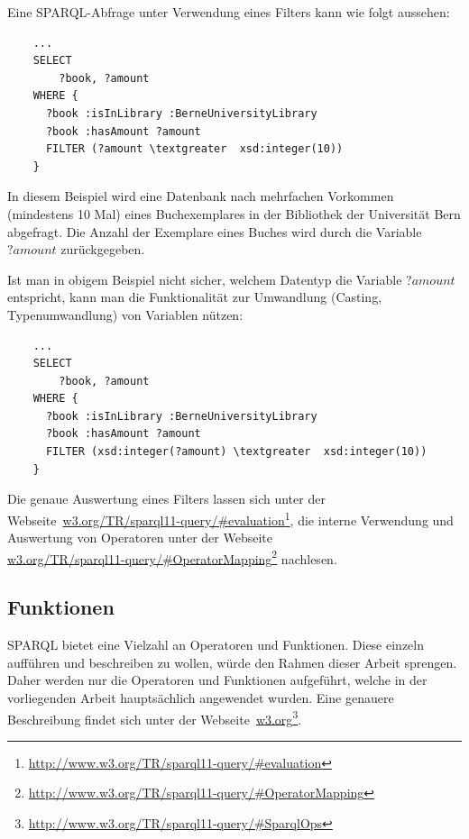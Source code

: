 Eine SPARQL-Abfrage unter Verwendung eines Filters kann wie folgt aussehen:
\begin{lstlisting}
    ...
    SELECT
        ?book, ?amount
    WHERE {
      ?book :isInLibrary :BerneUniversityLibrary
      ?book :hasAmount ?amount
      FILTER (?amount \textgreater  xsd:integer(10))
    }
\end{lstlisting}
In diesem Beispiel wird eine Datenbank nach mehrfachen Vorkommen (mindestens 10 Mal) eines Buchexemplares in der Bibliothek der Universität Bern abgefragt. Die Anzahl der Exemplare eines Buches wird durch die Variable $?amount$ zurückgegeben.

Ist man in obigem Beispiel nicht sicher, welchem Datentyp die Variable $?amount$ entspricht, kann man die Funktionalität zur Umwandlung (Casting, Typenumwandlung) von Variablen nützen:
\begin{lstlisting}
    ...
    SELECT
        ?book, ?amount
    WHERE {
      ?book :isInLibrary :BerneUniversityLibrary
      ?book :hasAmount ?amount
      FILTER (xsd:integer(?amount) \textgreater  xsd:integer(10))
    }
\end{lstlisting}

Die genaue Auswertung eines Filters lassen sich unter der Webseite~\href{http://www.w3.org/TR/sparql11-query/\#evaluation}{w3.org/TR/sparql11-query/\#evaluation}\footnote{\url{http://www.w3.org/TR/sparql11-query/\#evaluation}}, die interne Verwendung und Auswertung von Operatoren unter der Webseite\\
\href{http://www.w3.org/TR/sparql11-query/\#OperatorMapping}{w3.org/TR/sparql11-query/\#OperatorMapping}\footnote{\url{http://www.w3.org/TR/sparql11-query/\#OperatorMapping}} nachlesen.

\subsection{Funktionen}
\label{subsec:sparql_ausdruecke_funktionen}

SPARQL bietet eine Vielzahl an Operatoren und Funktionen. Diese einzeln aufführen und beschreiben zu wollen, würde den Rahmen dieser Arbeit sprengen. Daher werden nur die Operatoren und Funktionen aufgeführt, welche in der vorliegenden Arbeit hauptsächlich angewendet wurden. Eine genauere Beschreibung findet sich unter der Webseite~\href{http://www.w3.org/TR/sparql11-query/\#SparqlOps}{w3.org}\footnote{\url{http://www.w3.org/TR/sparql11-query/\#SparqlOps}}.

